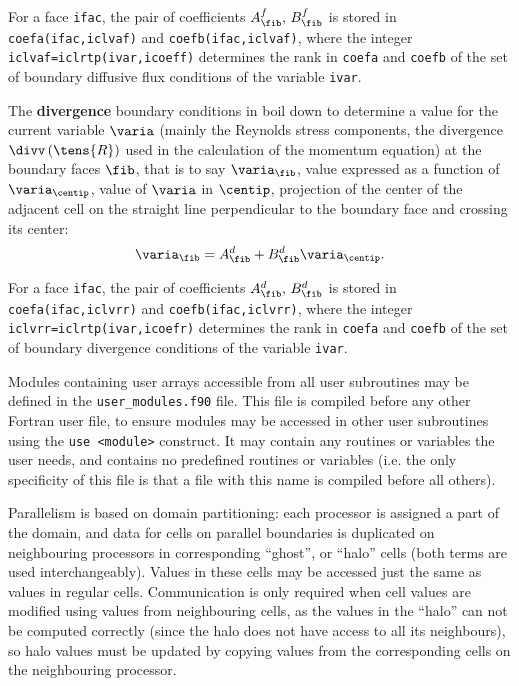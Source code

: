 {{{For a face \texttt{ifac}, the pair of coefficients $A_{\fib}^f , \, B_{\fib}^f$ is
stored in \texttt{coefa(ifac,iclvaf)} and
\texttt{coefb(ifac,iclvaf)}, where the integer \texttt{iclvaf=iclrtp(ivar,icoeff)}
determines the rank in \texttt{coefa} and \texttt{coefb} of the set of boundary
diffusive flux conditions of the variable \texttt{ivar}.

The \textbf{divergence} boundary conditions in \CS boil down to determine a value for the
current variable $\varia$ (mainly the Reynolds stress components, the divergence $\divv \left(\tens{R} \right)$ used in the calculation of the momentum equation) at the boundary faces $\fib$,
that is to say $\varia_\fib$,
value expressed as a function of $\varia_{\centip}$, value of $\varia$ in $\centip$,
projection of the center of the adjacent cell on the straight line
perpendicular to the boundary face and crossing its center:
\begin{equation}
\varia_\fib=A_{\fib}^d +B_{\fib}^d \varia_{\centip}.
\end{equation}

For a face \texttt{ifac}, the pair of coefficients $A_{\fib}^d , \, B_{\fib}^d$ is
stored in \texttt{coefa(ifac,iclvrr)} and
\texttt{coefb(ifac,iclvrr)}, where the integer \texttt{iclvrr=iclrtp(ivar,icoefr)}
determines the rank in \texttt{coefa} and \texttt{coefb} of the set of boundary
divergence conditions of the variable \texttt{ivar}.

\clearpage
Modules containing user arrays accessible from all user subroutines may
be defined in the \texttt{user\_modules.f90} file. This file is
compiled before any other Fortran user file, to ensure modules
may be accessed in other user subroutines using the \texttt{use <module>}
construct. It may contain any routines or variables the user needs,
and contains no predefined routines or variables (i.e. the only
specificity of this file is that a file with this name is compiled before
all others).


Parallelism is based on domain partitioning: each processor is assigned
a part of the domain, and data for cells on parallel boundaries
is duplicated on neighbouring processors in corresponding ``ghost'',
or ``halo'' cells (both terms are used interchangeably). Values in
these cells may be accessed just the same as values in regular cells.
Communication is only required when cell values are modified
using values from neighbouring cells, as the values in the ``halo'' can
not be computed correctly (since the halo does not have access to all
its neighbours), so halo values must be updated by copying values from
the corresponding cells on the neighbouring processor.

}}}
